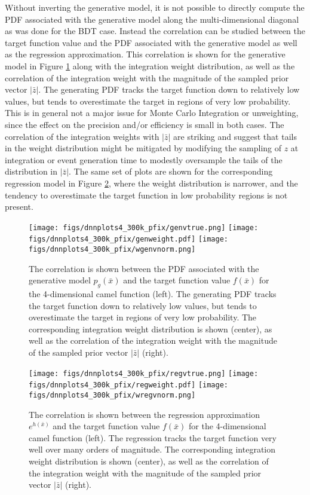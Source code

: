 \documentclass[a4paper,11pt]{article}
\begin{document}
Without inverting the generative model, it is not possible to directly compute the PDF associated with the generative model along the multi-dimensional diagonal as was done for the BDT case.  Instead the correlation can be studied between the target function value and the PDF associated with the generative model as well as the regression approximation.  This correlation is shown for the generative model in Figure \ref{fig:4dgenweights} along with the integration weight distribution, as well as the correlation of the integration weight with the magnitude of the sampled prior vector $|\bar z|$.  The generating PDF tracks the target function down to relatively low values, but tends to overestimate the target in regions of very low probability.  This is in general not a major issue for Monte Carlo Integration or unweighting, since the effect on the precision and/or efficiency is small in both cases.  The correlation of the integration weights with $|\bar z|$ are striking and suggest that tails in the weight distribution might be mitigated by modifying the sampling of $z$ at integration or event generation time to modestly oversample the tails of the distribution in $|\bar z|$.  The same set of plots are shown for the corresponding regression model in Figure \ref{fig:4dregweights}, where the weight distribution is narrower, and the tendency to overestimate the target function in low probability regions is not present.

\begin{figure}[htb!]
 \texttt{[image: figs/dnnplots4\_300k\_pfix/genvtrue.png]}
 \texttt{[image: figs/dnnplots4\_300k\_pfix/genweight.pdf]}
 \texttt{[image: figs/dnnplots4\_300k\_pfix/wgenvnorm.png]}
 \caption{The correlation is shown between the PDF associated with the generative model $p_g(\bar x)$ and the target function value $f(\bar x)$ for the 4-dimensional camel function (left).  The generating PDF tracks the target function down to relatively low values, but tends to overestimate the target in regions of very low probability.  The corresponding integration weight distribution is shown (center), as well as the correlation of the integration weight with the magnitude of the sampled prior vector $|\bar z|$ (right). }
 \label{fig:4dgenweights}
\end{figure}

\begin{figure}[htb!]
 \texttt{[image: figs/dnnplots4\_300k\_pfix/regvtrue.png]}
 \texttt{[image: figs/dnnplots4\_300k\_pfix/regweight.pdf]}
 \texttt{[image: figs/dnnplots4\_300k\_pfix/wregvnorm.png]}
 \caption{The correlation is shown between the regression approximation $e^{h(\bar x)}$ and the target function value $f(\bar x)$ for the 4-dimensional camel function (left).  The regression tracks the target function very well over many orders of magnitude.  The corresponding integration weight distribution is shown (center), as well as the correlation of the integration weight with the magnitude of the sampled prior vector $|\bar z|$ (right). }
 \label{fig:4dregweights}
\end{figure}
\end{document}
